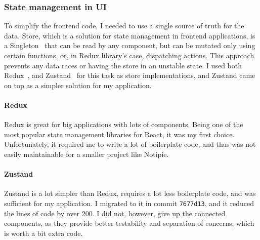 \subsubsection{State management in UI}\label{sec:state-management-in-ui}

To simplify the frontend code,
I needed to use a single source of truth for the data.
Store,
which is a solution for state management
in frontend applications,
is a Singleton~\cite{gamma_design_1994}
that can be read by any component,
but can be mutated only using certain functions,
or, in Redux library's case, dispatching actions.
This approach prevents any data races
or having the store in an unstable state.
I used both Redux~\cite{gaeraon_redux_2022},
and Zustand~\cite{kato_zustand_2022} for this task
as store implementations,
and Zustand came on top as a simpler solution for my application.

\paragraph*{Redux}\label{sec:redux}

Redux is great for big applications with lots of components.
Being one of the most popular state management libraries for React,
it was my first choice.
Unfortunately,
it required me to write a lot of boilerplate code,
and thus was not easily maintainable
for a smaller project like Notipie.

\paragraph*{Zustand}\label{sec:zustand}

Zustand is a lot simpler than Redux,
requires a lot less boilerplate code,
and was sufficient for my application.
I migrated to it in commit
\texttt{7677d13},
and it reduced the lines of code by over 200.
I did not, however, give up the connected components,
as they provide better testability and separation of concerns,
which is worth a bit extra code.

